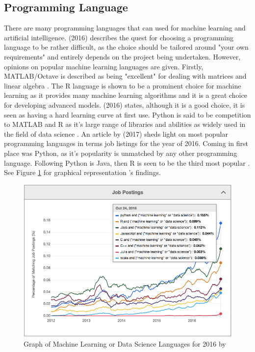 \subsection{Programming Language}
There are many programming languages that can used for machine learning and artificial intelligence. \citeauthor{brownlee} (2016) describes the quest for choosing a programming language to be rather difficult, as the choice should be tailored around "your own requirements" and entirely depends on the project being undertaken. However, opinions on popular machine learning languages are given. Firstly, MATLAB/Octave is described as being "excellent" for dealing with matrices and linear algebra \citep{brownlee}. The R language is shown to be a prominent choice for machine learning as it provides many machine learning algorithms and it is a great choice for developing advanced models. \citeauthor{brownlee} (2016) states, although it is a good choice, it is seen as having a hard learning curve at first use. Python is said to be competition to MATLAB and R as it's large range of libraries and abilities as widely used in the field of data science \citep{brownlee}.
An article by \citeauthor{verma_2017} (2017) sheds light on most popular programming languages in terms job listings for the year of 2016. Coming in first place was Python, as it's popularity is unmatched by any other programming language. Following Python is Java, then R is seen to be the third most popular \citep{verma_2017}. See Figure \ref{verma} for graphical representation \citeauthor{verma_2017}'s findings.

\begin{figure}[ht]
	\begin{center}
		\advance\leftskip-3cm
		\advance\rightskip-3cm
		\includegraphics[keepaspectratio=true,scale=0.6]{__resources/research/top_lang.jpg}
		\caption{Graph of Machine Learning or Data Science Languages for 2016 by \cite{verma_2017}}
		\label{verma}
	\end{center}
\end{figure}

